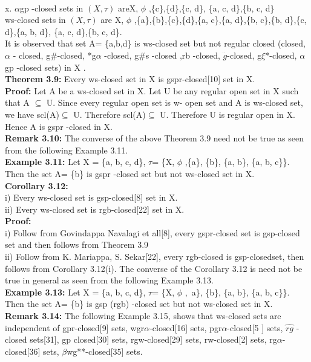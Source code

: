 {		\\x.	$\alpha$gp -closed sets in $(X,\tau)$ areX, $\phi$ ,\{c\},\{d\},\{c, d\}, \{a, c, d\},\{b, c, d\}
		\\ws-closed sets in  $(X,\tau)$ are  X, $\phi$ ,\{a\},\{b\},\{c\},\{d\},\{a, c\},\{a, d\},\{b, c\},\{b, d\},\{c, d\},\{a, b, d\}, \{a, c, d\},\{b, c, d\}.
		\\\indent It is observed that set   A= \{a,b,d\} is ws-closed set but not regular closed (closed,  $\alpha$ - closed, g$\#$-closed, *g$\alpha$ -closed, g$\#$s -closed ,rb -closed,    $\ddot{g}$-closed,   g$\xi$*-closed, $\alpha$gp -closed  sets) in X .
		\\\textbf{Theorem 3.9:} Every ws-closed set in X is gspr-closed[10] set in X.
		\\\textbf{Proof:}  Let A be a  ws-closed set in X. Let U be any regular open set in X  such that  A $\subseteq$ U. Since every regular  open set is w- open set and A is  ws-closed set, we have scl(A)$\subseteq$  U. Therefore scl(A)$\subseteq$  U. Therefore U is regular open in X. Hence A is gspr -closed in X.
		\\\textbf{Remark 3.10:} The converse of the above Theorem 3.9 need not be true as seen from the following Example 3.11.
		\\\textbf{Example 3.11:} Let X = \{a, b, c, d\},   $\tau$= \{X, $\phi$ ,\{a\}, \{b\}, \{a, b\}, \{a, b, c\}\}.    Then the set A= \{b\} is gspr -closed set but not ws-closed set in X.
		\\\textbf{Corollary 3.12:}
		\\i)	Every ws-closed set is gsp-closed[8] set in X.
		\\ii)	 Every ws-closed set is rgb-closed[22] set in X.
		\\\textbf{Proof:}
		\\i) Follow from Govindappa Navalagi et all[8], every gspr-closed set is gsp-closed set and then follows from Theorem 3.9
		\\ii) Follow from K. Mariappa, S. Sekar[22], every rgb-closed is gsp-closedset, then follows from Corollary 3.12(i).
		The converse of the Corollary 3.12 is need not be true in general as seen from the following Example 3.13.
		\\\textbf{Example 3.13:} Let X = \{a, b, c, d\},   $\tau$= \{X, $\phi$ ,\ {a\}, \{b\}, \{a, b\}, \{a, b, c\}\}.  Then the set A= \{b\} is gsp (rgb) -closed set but not ws-closed set in X.
			\\\textbf{Remark 3.14:} The following Example 3.15, shows that ws-closed sets are independent of gpr-closed[9] sets, wgr$\alpha$-closed[16] sets, pgr$\alpha$-closed[5 ] sets, $\widehat{rg}$ -closed sets[31], gp closed[30] sets, rgw-closed[29] sets, rw-closed[2] sets, rg$\alpha$-closed[36] sets, $\beta$wg**-closed[35] sets.
}}
